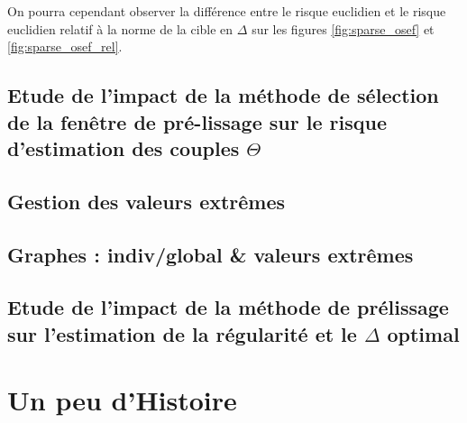 On pourra cependant observer la différence entre le risque euclidien et le risque euclidien relatif à la norme de la cible en $\Delta$ sur les figures \ref{fig:sparse_osef} et \ref{fig:sparse_osef_rel}.


\begin{comment}
\section{Récapitulatif de la qualité des estimations pour la stratégie de \og lissage global \fg}

\end{comment}

\section{Etude de l'impact de la méthode de sélection de la fenêtre de pré-lissage sur le risque d'estimation des couples $\Theta$}


% 




\section{Gestion des valeurs extrêmes}


\section{Graphes : indiv/global \& valeurs extrêmes}
\pagebreak




\section{Etude de l'impact de la méthode de prélissage sur l'estimation de la régularité et le $\Delta$ optimal}
\label{annexe:prelissage_impact}



\chapter{Un peu d'Histoire}
\label{annexe:histoire}
